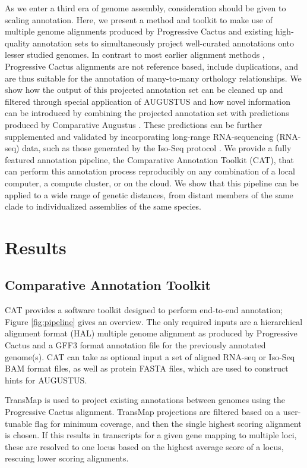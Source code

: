 \documentclass[fleqn,10pt]{wlscirep}
\begin{document}
As we enter a third era of genome assembly, consideration should be given to scaling annotation. Here, we present a method and toolkit to make use of multiple genome alignments produced by Progressive Cactus  \citep{paten2011cactus} and existing high-quality annotation sets 
 to simultaneously project well-curated annotations onto lesser studied genomes. 
In contrast to most earlier alignment methods  \citep{blanchette2004aligning,earl2014alignathon,miller200728}, Progressive Cactus alignments are not reference based, include duplications, and are thus suitable for the annotation of many-to-many orthology relationships. We show how the output of this projected annotation set can be cleaned up and filtered through special application of AUGUSTUS  \citep{stanke2008using} and how novel information can be introduced by combining the projected annotation set with predictions produced by Comparative Augustus  \citep{konig2015simultaneous}. These predictions can be further supplemented and validated by incorporating long-range RNA-sequencing (RNA-seq) data, such as those generated by the Iso-Seq protocol  \citep{gordon2015widespread}. We provide a fully featured annotation pipeline, the Comparative Annotation Toolkit (CAT), that can perform this annotation process reproducibly on any combination of a local computer, a compute cluster, or on the cloud. We show that this pipeline can be applied to a wide range of genetic distances, from distant members of the same clade to individualized assemblies of the same species.


\section*{Results}

\subsection*{Comparative Annotation Toolkit}

CAT provides a software toolkit designed to perform end-to-end annotation; Figure \ref{fig:pipeline} gives an overview. The only required inputs are a hierarchical alignment format (HAL)  \citep{hickey2013hal} multiple genome alignment as produced by Progressive Cactus and a GFF3 format annotation file for the previously annotated genome(s). CAT can take as optional input a set of aligned RNA-seq or Iso-Seq BAM format files, as well as protein FASTA files, which are used to construct hints for AUGUSTUS. 

TransMap \citep{stanke2008using,zhu2007comparative} is used to project existing annotations between genomes using the Progressive Cactus alignment. TransMap projections are filtered based on a user-tunable flag for minimum coverage, and then the single highest scoring alignment is chosen. If this results in transcripts for a given gene mapping to multiple loci, these are resolved to one locus based on the highest average score of a locus, rescuing lower scoring alignments. 
\end{document}
